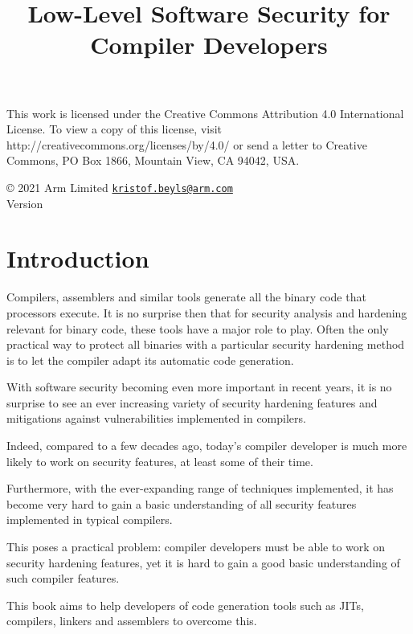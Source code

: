 \documentclass[a4paper,]{report}
\title{Low-Level Software Security for Compiler Developers}
\date{}
\begin{document}
\maketitle

\clearpage

\vspace*{\fill}
This work is licensed under the Creative Commons Attribution 4.0 International
License. To view a copy of this license, visit
http://creativecommons.org/licenses/by/4.0/ or send a letter to Creative
Commons, PO Box 1866, Mountain View, CA 94042, USA.

  © 2021 Arm Limited
  \href{mailto:kristof.beyls@arm.com}{\nolinkurl{kristof.beyls@arm.com}}\\

Version 
\clearpage

{
\hypersetup{linkcolor=}
\setcounter{tocdepth}{2}
\tableofcontents
}
\hypertarget{introduction}{%
\chapter{Introduction}\label{introduction}}

Compilers, assemblers and similar tools generate all the binary code
that processors execute. It is no surprise then that for security
analysis and hardening relevant for binary code, these tools have a
major role to play. Often the only practical way to protect all binaries
with a particular security hardening method is to let the compiler adapt
its automatic code generation.

With software security becoming even more important in recent years, it
is no surprise to see an ever increasing variety of security hardening
features and mitigations against vulnerabilities implemented in
compilers.

Indeed, compared to a few decades ago, today's compiler developer is
much more likely to work on security features, at least some of their
time.

Furthermore, with the ever-expanding range of techniques implemented, it
has become very hard to gain a basic understanding of all security
features implemented in typical compilers.

This poses a practical problem: compiler developers must be able to work
on security hardening features, yet it is hard to gain a good basic
understanding of such compiler features.

This book aims to help developers of code generation tools such as JITs,
compilers, linkers and assemblers to overcome this.
\end{document}
